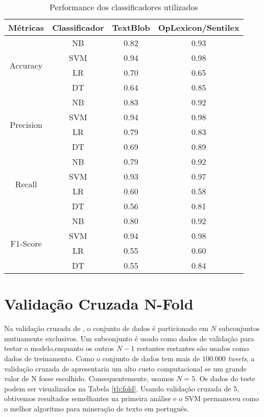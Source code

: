  
 \begin{table}[htbp]
     \centering
     \caption{Performance dos classificadores utilizados}
     \label{tb:metricas}
     \begin{tabular}{@{}cccc@{}}
     \\    \hline
     Métricas & Classificador & TextBlob & OpLexicon/Sentilex \\  \hline
     \multirow{4}{*}{Accuracy} & NB & 0.82 & 0.93 \\  
      & SVM & 0.94 & 0.98 \\ 
      & LR & 0.70 & 0.65 \\
      & DT & 0.64 & 0.85 \\ \hline
     \multirow{4}{*}{Precision} & NB & 0.83 & 0.92 \\ 
      & SVM & 0.94 & 0.98 \\ 
      & LR & 0.79 & 0.83 \\ 
      & DT & 0.69 & 0.89 \\ \hline
     \multirow{4}{*}{Recall} & NB & 0.79 & 0.92 \\ 
      & SVM & 0.93 & 0.97 \\ 
      & LR & 0.60 & 0.58 \\ 
      & DT & 0.56 & 0.81 \\ \hline
     \multirow{4}{*}{F1-Score} & NB & 0.80 & 0.92 \\ 
      & SVM & 0.94 & 0.98 \\ 
      & LR & 0.55 & 0.60 \\ 
      & DT & 0.55 & 0.84 \\ \hline
     \end{tabular}
     \end{table}
     
 \section{Validação Cruzada N-Fold}
 
 Na validação cruzada de , o conjunto de dados é
 particionado em $N$ subconjuntos mutuamente exclusivos.
 Um subconjunto é usado como dados de validação para testar
 o modelo,enquanto os outros $N - 1$ restantes  restantes são usados como
 dados de treinamento. Como o conjunto de dados tem mais
 de $100.000$ \textit{tweets}, a validação cruzada de  apresentaria
 um alto custo computacional se um grande valor de N fosse
 escolhido. Consequentemente, usamos $N = 5$. Os dados do
 teste podem ser visualizados na Tabela \ref{tb:fold}.
 Usando validação cruzada de 5, obtivemos resultados
 semelhantes na primeira análise e o SVM permaneceu como
 o melhor algoritmo para mineração de texto em português.
 
